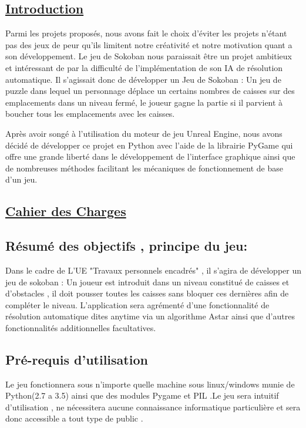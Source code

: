 \documentclass{article}
\begin{document}
\newpage
\begin{center}
	\section{\underline{Introduction}}
	\vspace{2 cm}
	Parmi les projets proposés, nous avons fait le choix d’éviter les projets n’étant
pas des jeux de peur qu’ils limitent notre créativité et notre motivation quant a
son développement. Le jeu de Sokoban nous paraissait être un projet ambitieux
et intéressant de par la difficulté de l’implémentation de son IA de résolution automatique.
Il s'agissait donc de développer un Jeu de Sokoban : Un jeu de puzzle dans
lequel un personnage déplace un certains nombres de caisses sur des emplacements
dans un niveau fermé, le joueur gagne la partie si il parvient à boucher
tous les emplacements avec les caisses.

Après avoir songé à l’utilisation du moteur de jeu Unreal Engine, nous avons
décidé de développer ce projet en Python avec l’aide de la librairie PyGame
qui offre une grande liberté dans le développement de l'interface graphique ainsi que de nombreuses
méthodes facilitant les mécaniques de fonctionnement de base d’un jeu.

\end{center}

\newpage
\begin{center}
	\section{\underline{Cahier des Charges}}
	\vspace{2 cm}
	\end{center}
		\subsection{Résumé des objectifs , principe du jeu:}
		\vspace{1cm}
		Dans le cadre de L'UE "Travaux personnels encadrés" , il s'agira de développer un jeu de sokoban : Un joueur est introduit dans un niveau constitué de caisses et d'obstacles , il doit pousser toutes les caisses sans bloquer ces dernières afin de compléter le niveau.
		L'application sera agrémenté d'une fonctionnalité de résolution automatique dites anytime via un algorithme Astar ainsi que d'autres fonctionnalités additionnelles facultatives.
		
		
		\subsection{Pré-requis d'utilisation}
		\vspace{1cm}
		Le jeu fonctionnera sous n'importe quelle machine sous linux/windows munie de Python(2.7 a 3.5) ainsi que des modules Pygame et PIL .Le jeu sera intuitif d’utilisation , ne nécessitera aucune connaissance informatique particulière et sera donc accessible a tout type de public .
\end{document}
